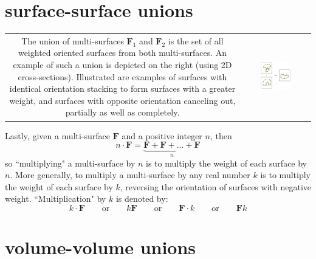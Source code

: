 \section{surface-surface unions}

\vspace{5mm}

\begin{tabular}{cc}
\parbox{0.5\textwidth}{
The union of multi-surfaces \(\mathbf{F}_1\) and \(\mathbf{F}_2\) is the set of all weighted oriented surfaces from both multi-surfaces. An example of such a union is depicted on the right (using 2D cross-sections). Illustrated are examples of surfaces with identical orientation stacking to form surfaces with a greater weight, and surfaces with opposite orientation canceling out, partially as well as completely.
} & \parbox{0.5\textwidth}{
\includegraphics[width = 0.5\textwidth]{Unions/multisurface_unions}
}
\end{tabular}

Lastly, given a multi-surface \(\mathbf{F}\) and a positive integer \(n\), then
\[n \cdot \mathbf{F} = \underbrace{\mathbf{F} + \mathbf{F} + ... + \mathbf{F}}_n\]
so ``multiplying" a multi-surface by \(n\) is to multiply the weight of each surface by \(n\). More generally, to multiply a multi-surface by any real number \(k\) is to multiply the weight of each surface by \(k\), reversing the orientation of surfaces with negative weight. ``Multiplication" by \(k\) is denoted by:
\[k \cdot \mathbf{F} \quad\quad\text{or}\quad\quad k\mathbf{F} \quad\quad\text{or}\quad\quad \mathbf{F} \cdot k \quad\quad\text{or}\quad\quad \mathbf{F} k\]



\section{volume-volume unions}

\vspace{5mm}

